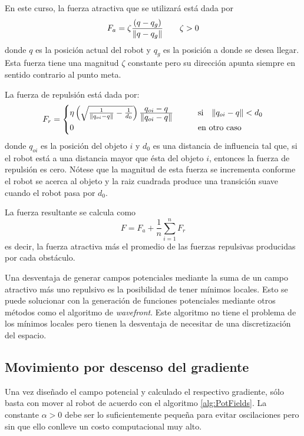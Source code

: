 En este curso, la fuerza atractiva que se utilizará está dada por
\begin{equation}
\label{eq:attractive}
F_a = \zeta \frac{\displaystyle \left(q - q_g\right) }{\displaystyle \Vert q - q_g \Vert}\qquad \zeta > 0
\end{equation}
donde $q$ es la posición actual del robot y $q_g$ es la posición a donde se desea llegar. Esta fuerza tiene una magnitud $\zeta$ constante pero su dirección apunta siempre en sentido contrario al punto meta. 

La fuerza de repulsión está dada por:
\begin{equation}
\label{eq:repulsive}
F_r = \begin{cases}
\eta\left(\sqrt{\frac{1}{\Vert q_{oi} - q\Vert} - \frac{1}{d_0}}\right)\frac{\displaystyle q_{oi} - q}{\displaystyle \Vert q_{oi} - q\Vert}
& \qquad\textrm{si}\quad \Vert q_{oi} - q\Vert < d_0\\
0 & \qquad\textrm{en otro caso}
\end{cases}
\end{equation}
donde $q_{oi}$ es la posición del objeto $i$ y $d_0$ es una distancia de influencia tal que, si el robot está a una distancia mayor que ésta del objeto $i$, entonces la fuerza de repulsión es cero. Nótese que la magnitud de esta fuerza se incrementa conforme el robot se acerca al objeto y la raiz cuadrada produce una transición suave cuando el robot pasa por $d_0$.

La fuerza resultante se calcula como 
\begin{equation}
\label{eq:resulting}
F = F_a + \frac{1}{n}\sum_{i=1}^n F_r
\end{equation}
es decir, la fuerza atractiva más el promedio de las fuerzas repulsivas producidas por cada obstáculo.

Una desventaja de generar campos potenciales mediante la suma de un campo atractivo más uno repulsivo es la posibilidad de tener mínimos locales. Esto se puede solucionar con la generación de funciones potenciales mediante otros métodos como el algoritmo de \textit{wavefront}. Este algoritmo no tiene el problema de los mínimos locales pero tienen la desventaja de necesitar de una discretización del espacio.

\subsection{Movimiento por descenso del gradiente}
Una vez diseñado el campo potencial y calculado el respectivo gradiente, sólo basta con mover al robot de acuerdo con el algoritmo \ref{alg:PotFields}. La constante $\alpha > 0$ debe ser lo suficientemente pequeña para evitar oscilaciones pero sin que ello conlleve un costo computacional muy alto. 

